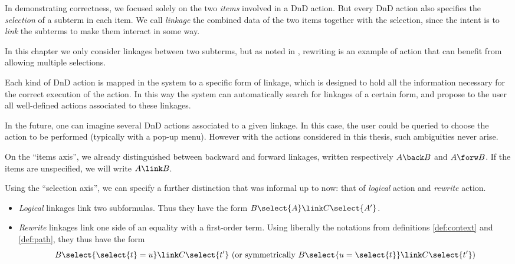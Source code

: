 In demonstrating correctness, we focused solely on the two \emph{items} involved
in a DnD action. But every DnD action also specifies the \emph{selection} of a
subterm in each item. We call \emph{linkage} the combined data of the two items
together with the selection, since the intent is to \emph{link} the subterms
to make them interact in some way.

\begin{remark}
In this chapter we only consider linkages between two subterms, but as noted in
, rewriting is an example of action that can benefit from
allowing multiple selections.
\end{remark}

Each kind of DnD action is mapped in the system to a specific form of linkage,
which is designed to hold all the information necessary for the correct
execution of the action. In this way the system can automatically search for
linkages of a certain form, and propose to the user all well-defined actions
associated to these linkages.

\begin{remark}
  In the future, one can imagine several DnD actions associated to a given
  linkage. In this case, the user could be queried to choose the action to be
  performed (typically with a pop-up menu). However with the actions considered
  in this thesis, such ambiguities never arise.
\end{remark}

On the ``items axis'', we already distinguished between backward and forward
linkages, written respectively $A \back B$ and $A \forw B$. If the items are
unspecified, we will write $A \link B$.

Using the ``selection axis'', we can specify a further distinction that was
informal up to now: that of \emph{logical} action and \emph{rewrite} action.
\begin{itemize}
  \item \emph{Logical} linkages link two subformulas. Thus they have the form
  $B\select{A} \link C\select{A'}$.
  \item \emph{Rewrite} linkages link one side of an equality with a first-order
  term. Using liberally the notations from definitions \ref{def:context} and
  \ref{def:path}, they thus have the form
  $$B\select{\select{t} = u} \link C
  \select{t'} \text{\ (or symmetrically $B\select{u = \select{t}} \link C
  \select{t'}$)}$$
\end{itemize}

